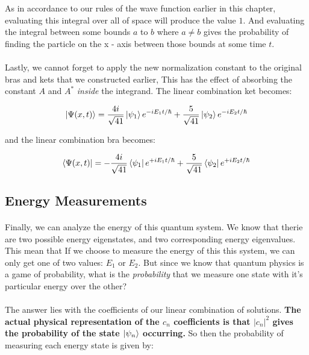 \documentclass[12pt,letterpaper]{book}
\begin{document}
As in accordance to our rules of the wave function earlier in this chapter, evaluating this integral over all of space will produce the value $1$. And evaluating the integral between some bounds $a$ to $b$ where $a \neq  b$ gives the probability of finding the particle on the x - axis between those bounds at some time $t$.

\paragraph*{}Lastly, we cannot forget to apply the new normalization constant to the original bras and kets that we constructed earlier, This has the effect of absorbing the constant $A$ and $A^*$ \textit{inside} the integrand. The linear combination ket becomes:

\begin{equation}
\label{ex1 norm ket}
\ket{\Psi(x,t)} =  \frac{4i}{\sqrt{41}} \ket{\psi_1}e^{-iE_1t/\hbar} + \frac{5}{\sqrt{41}} \ket{\psi_2} e^{-iE_2t/\hbar}
\end{equation}

and the linear combination bra becomes:

\begin{equation}
\label{ex1 norm bra}
\bra{\Psi(x,t)} =  -\frac{4i}{\sqrt{41}} \bra{\psi_1}e^{+iE_1t/\hbar} + \frac{5}{\sqrt{41}} \bra{\psi_2} e^{+iE_2t/\hbar}
\end{equation}


\subsection*{Energy Measurements}

\paragraph*{}Finally, we can analyze the energy of this quantum system. We know that therie are two possible energy eigenstates, and two corresponding energy eigenvalues. This mean that If we choose to measure the energy of this this system, we can only get one of two values: $E_1$ or $E_2$. But since we know that quantum physics is a game of probability, what is the \textit{probability} that we measure one state with it's particular energy over the other?

\paragraph*{}The answer lies with the coefficients of our linear combination of solutions. \textbf{The actual physical representation of the $c_n$ coefficients is that $|c_n|^2$ gives the probability of the state $\ket{\psi_n}$ occurring.} So then the probability of measuring each energy state is given by:
\end{document}
